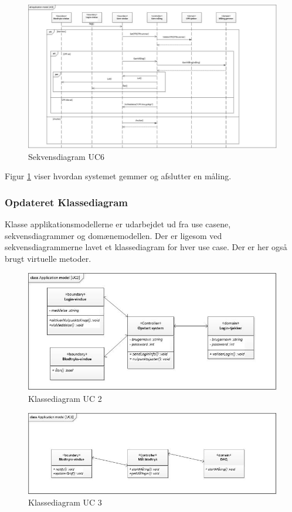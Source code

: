 \begin{figure}[H]
	\includegraphics[width=1\textwidth]{Figurer/ISE/sdAppModelUC6}
	\caption{Sekvensdiagram UC6}
	\label{sd UC6}
\end{figure}

Figur \ref{sd UC6} viser hvordan systemet gemmer og afslutter en måling. 

\subsubsection{Opdateret Klassediagram}
Klasse applikationsmodellerne er udarbejdet ud fra use casene, sekvensdiagrammer og domænemodellen. Der er ligesom ved sekvensdiagrammerne lavet et klassediagram for hver use case. Der er her også brugt virtuelle metoder. 

\begin{figure}[H]
	\centering
	\includegraphics[width=1\textwidth]{Figurer/ISE/classAppModelUC2}
	\caption{Klassediagram UC 2}
	\label{classApp UC2}
\end{figure}

\begin{figure}[H]
	\centering
	\includegraphics[width=1\textwidth]{Figurer/ISE/classAppModelUC3}
	\caption{Klassediagram UC 3}
	\label{classApp UC3}
\end{figure}

